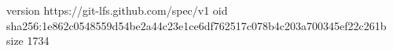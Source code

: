 version https://git-lfs.github.com/spec/v1
oid sha256:1e862c0548559d54be2a44c23e1ce6df762517c078b4c203a700345ef22c261b
size 1734
